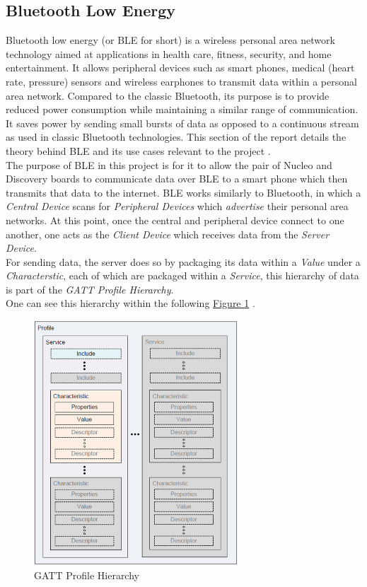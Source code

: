 \subsection{Bluetooth Low Energy}

Bluetooth low energy (or BLE for short) is a wireless personal area network technology aimed at applications in health care, fitness, security, and home entertainment. 
It allows peripheral devices such as smart phones, medical (heart rate, pressure) sensors and wireless earphones to transmit data within a personal area network. 
Compared to the classic Bluetooth, its purpose is to provide reduced power consumption while maintaining a similar range of communication. 
It saves power by sending small bursts of data as opposed to a continuous stream as used in classic Bluetooth technologies. 
This section of the report details the theory behind BLE and its use cases relevant to the project \cite{gatt}.\\

The purpose of BLE in this project is for it to allow the pair of Nucleo and Discovery boards to communicate data over BLE to a smart phone which then transmits that data to the internet. 
BLE works similarly to Bluetooth, in which a \textit{Central Device} scans for \textit{Peripheral Devices} which \textit{advertise} their personal area networks. 
At this point, once the central and peripheral device connect to one another, one acts as the \textit{Client Device} which receives data from the \textit{Server Device}.\\

For sending data, the server does so by packaging its data within a \textit{Value} under a \textit{Characterstic}, each of which are packaged within a \textit{Service}, this hierarchy of data is part of the \textit{GATT Profile Hierarchy}.\\
One can see this hierarchy within the following \hyperref[fig:uiscreenshot]{Figure \ref{fig:gatt}} \cite{gatt}.\\
\begin{figure}[h]
	\caption{GATT Profile Hierarchy}\label{fig:gatt}
	\begin{center}
		\includegraphics[width=3in]{GATT_Profile_Hierarchy.png}
	\end{center}
\end{figure}

